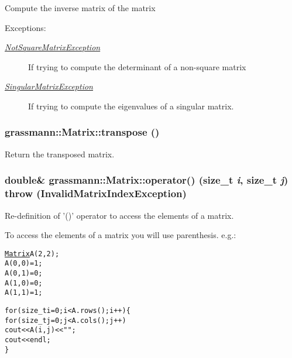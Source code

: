 Compute the inverse matrix of the matrix \begin{Desc}
\item[Exceptions:]
\begin{description}
\item[{\em \hyperlink{classgrassmann_1_1NotSquareMatrixException}{NotSquareMatrixException}}]If trying to compute the determinant of a non-square matrix \item[{\em \hyperlink{classgrassmann_1_1SingularMatrixException}{SingularMatrixException}}]If trying to compute the eigenvalues of a singular matrix. \end{description}
\end{Desc}


\hypertarget{classgrassmann_1_1Matrix_8140d96d30dacb7d36e51a0c2bd1cbf5}{
\subsubsection[transpose]{ grassmann::Matrix::transpose ()}}
\label{classgrassmann_1_1Matrix_8140d96d30dacb7d36e51a0c2bd1cbf5}


Return the transposed matrix. 

\hypertarget{classgrassmann_1_1Matrix_9073db52849385a50a1e7d9ba2b5c18c}{
\subsubsection[operator()]{\setlength{\rightskip}{0pt plus 5cm}double\& grassmann::Matrix::operator() (size\_\-t {\em i}, \/  size\_\-t {\em j})  throw ({\bf InvalidMatrixIndexException})}}
\label{classgrassmann_1_1Matrix_9073db52849385a50a1e7d9ba2b5c18c}


Re-definition of '()' operator to access the elements of a matrix. 

To access the elements of a matrix you will use parenthesis. e.g.:\small\begin{alltt}
  \hyperlink{classgrassmann_1_1Matrix}{Matrix} A(2,2);
  A(0,0) = 1;
  A(0,1) = 0;
  A(1,0) = 0;
  A(1,1) = 1;\end{alltt}
\normalsize 


\small\begin{alltt}  for (size\_t i=0; i < A.rows(); i++)  \{
    for (size\_t j=0; j < A.cols(); j++)
      cout << A(i,j) << " ";
    cout << endl;
  \}\end{alltt}
\normalsize 



